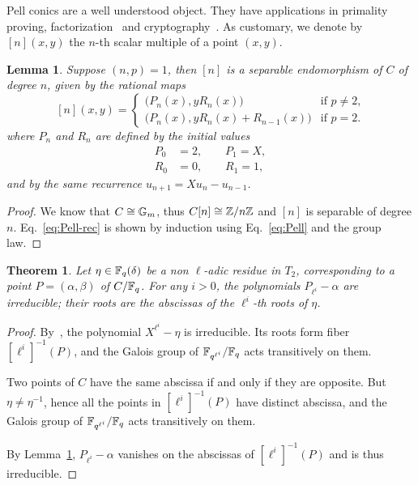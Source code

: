 \documentclass{sig-alternate}
\newtheorem{theorem}[definition]{Theorem}
\newtheorem{lemma}[definition]{Lemma}
\begin{document}
Pell conics are a well understood object. They have applications in
primality proving, factorization~\cite{lemmermeyer03,hambleton12} and
cryptography~\cite{rubin-silverberg+crypto03}. As customary, we denote
by $[n](x,y)$ the $n$-th scalar multiple of a point
$(x,y)$.

\begin{lemma}
  \label{th:T2-divpol}
  Suppose $(n,p)=1$, then $[n]$ is a separable endomorphism of $C$ of
  degree $n$, given by the rational maps
  \begin{equation}
    \label{eq:Pell-rec}
    [n](x,y) = 
    \begin{cases}
      \bigr(P_n(x), y R_n(x)\bigl) & \text{if $p\ne2$,}\\
      \bigr(P_n(x), y R_n(x) + R_{n-1}(x)\bigl) & \text{if $p=2$.}      
    \end{cases}
  \end{equation}
  where $P_n$ and $R_n$ are defined by the initial values
  \begin{align*}
    P_0 &= 2,\qquad P_1=X,\\
    R_0 &= 0,\qquad R_1=1,
  \end{align*}
  and by the same recurrence $u_{n+1} = Xu_{n} - u_{n-1}$.
\end{lemma}
\begin{proof}
  We know that $C\cong\mathbb{G}_m$, thus $C[n]\cong\mathbb{Z}/n\mathbb{Z}$ and $[n]$
  is separable of degree $n$. Eq.~\eqref{eq:Pell-rec} is shown by
  induction using Eq.~\eqref{eq:Pell} and the group law.
\end{proof}





\begin{theorem}
  \label{th:T2-irred}
  Let $\eta\in\mathbb{F}_q(\delta)$ be a non $\ell$-adic residue in $T_2$,
  corresponding to a point $P=(\alpha,\beta)$ of $C/\mathbb{F}_q$. For any
  $i>0$, the polynomials $P_{\ell^i}-\alpha$ are irreducible; their
  roots are the abscissas of the $\ell^i$-th roots of $\eta$.
\end{theorem}
\begin{proof}
  By~\cite[Th.~VI.9.1]{lang}, the polynomial $X^{\ell^i}-\eta$ is
  irreducible. Its roots form fiber $[\ell^i]^{-1}(P)$, and the Galois
  group of $\mathbb{F}_{q^{\ell^i}}/\mathbb{F}_q$ acts transitively on them.

  Two points of $C$ have the same abscissa if and only if they are
  opposite. But $\eta\ne\eta^{-1}$, hence all the points in
  $[\ell^i]^{-1}(P)$ have distinct abscissa, and the Galois group of
  $\mathbb{F}_{q^{\ell^i}}/\mathbb{F}_q$ acts transitively on them.  

  By Lemma~\ref{th:T2-divpol}, $P_{\ell^i}-\alpha$ vanishes on the
  abscissas of $[\ell^i]^{-1}(P)$ and is thus irreducible.
\end{proof}
\end{document}
